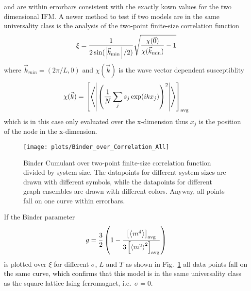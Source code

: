 and are within errorbars consistent with the exactly kown values for the
two dimensional IFM.
A newer method\cite{chiCollapse,Hartmann2013} to test if two models are in
the same universality class is the analysis of the two-point finite-size
correlation function
\[\xi = \frac{1}{2\sin(\left\vert\vec{k}_{\mathrm{min}}\right\vert/2)} \sqrt{\frac{\chi(\vec{0})}{\chi(\vec{k}_{\mathrm{min}})} - 1}\]
where $\vec{k}_{min}=(2\pi / L, 0)$ and $\chi(\vec{k})$ is the wave vector
dependent susceptiblity
\[\chi(\vec{k}) = \left[ \left< \left\vert\left(\frac{1}{N}\sum_j s_j \exp(ikx_j)\right)^2\right\vert \right> \right] _{\mathrm{avg}}\]
which is in this case only evaluated over the x-dimension thus $x_j$ is the
position of the node in the x-dimension.

\begin{figure}[htbp]
    \centering
    \texttt{[image: plots/Binder\_over\_Correlation\_All]}
    \caption[Binder Cumulant over two-point finite-size correlation function divided by system size]
    {
        Binder Cumulant over two-point finite-size correlation function
        divided by system size. The datapoints for different system sizes
        are drawn with different symbols, while the datapoints for different
        graph ensembles are drawn with different colors. Anyway, all points
        fall on one curve within errorbars.
    }
    \label{fig:binderOverCorr}
\end{figure}
If the Binder parameter
\[g = \frac{3}{2}\left(1-\frac{\left[ \left< m^4 \right> \right] _{\mathrm{avg}}}{3\left[ \left< m^2 \right>^2 \right] _{\mathrm{avg}}}\right)\]
is plotted over $\xi$ for different $\sigma$, $L$ and $T$ as shown in
Fig.~\ref{fig:binderOverCorr} all data points fall on the
same curve, which confirms that this model is in the same universality
class as the square lattice Ising ferromagnet, i.e.~$\sigma=0$.

